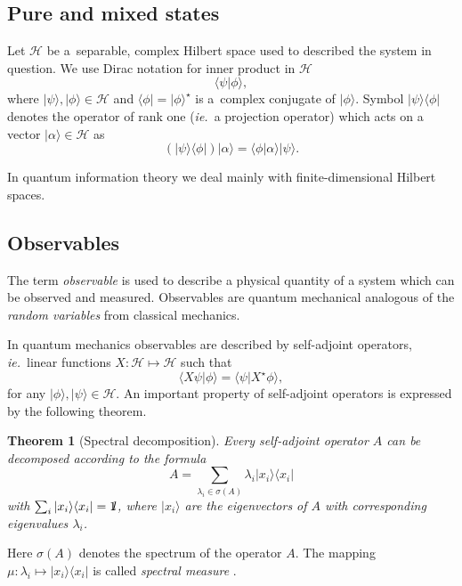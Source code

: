 \documentclass{elsart}
\newcommand{\ket}[1]{\ensuremath{|#1\rangle}}
\newcommand{\bra}[1]{\ensuremath{\langle#1|}}
\newcommand{\1}{{\rm 1\hspace{-0.9mm}l}}
\newcommand{\Id}{\1}
\newcommand{\HS}[1]{\ensuremath{\mathcal{#1}}} %
\newcommand{\ie}{\emph{ie.}}
\newcommand{\Observ}[1]{\ensuremath{#1}}
\newcommand{\Spectrum}[1]{\ensuremath{\sigma(#1)}}
\newcommand{\Spec}[1]{\Spectrum{#1}}
\newcommand{\ketbra}[2]{\ensuremath{\ket{#1}\bra{#2}}}
\newcommand{\proj}[1]{\ensuremath{\ketbra{#1}{#1}}}
\newcommand{\Proj}[1]{\proj{#1}}
\newcommand{\iner}[2]{\braket{#1}{#2}}
\newcommand{\Iner}[2]{\iner{#1}{#2}}
\newcommand{\braket}[2]{\ensuremath{\langle#1|#2\rangle}}
\newtheorem{theorem}{Theorem}
\begin{document}
\subsection{Pure and mixed states}
Let $\HS{H}$ be a~separable, complex Hilbert space used
to described the system in question. We use Dirac notation
\cite{dirac58principles} for inner product in $\HS{H}$
\begin{equation}
  \Iner{\psi}{\phi},
\label{eqn:dirac-iner}
\end{equation}
where $\ket{\psi},\ket{\phi}\in\HS{H}$ and $\bra{\phi} = \ket{\phi}^\star$ 
is a~complex conjugate of $\ket{\phi}$. Symbol $\ket{\psi}\bra{\phi}$ denotes
the operator of rank one (\ie\ a projection operator) which acts on a vector
$\ket{\alpha}\in\HS{H}$ as
\begin{equation}
\left(\ket{\psi}\bra{\phi}\right)\ket{\alpha} = \Iner{\phi}{\alpha}\ket{\psi}.
\label{eqn:dirac-proj}
\end{equation}

In quantum information theory we deal mainly with finite-dimensional Hilbert
spaces.

\subsection{Observables}
The term \emph{observable} is used to describe a physical
quantity of a system which can be observed and measured. Observables are
quantum mechanical analogous of the \emph{random variables} from classical mechanics.

In quantum mechanics observables are described by self-adjoint operators,
\ie\ linear functions $X:\HS{H}\mapsto\HS{H}$ such that
\begin{equation}
\Iner{X\psi}{\phi}=\Iner{\psi}{X^\star\phi},
\label{eqn:selfadj}
\end{equation}
for any $\ket{\phi},\ket{\psi}\in\HS{H}$. An important property of self-adjoint
operators is expressed by the following theorem.

\begin{theorem}[Spectral decomposition]
Every self-adjoint operator $\Observ{A}$ can be decomposed according to the
formula
\begin{equation}
\Observ{A} = \sum_{\lambda_i\in\Spec{\Observ{A}}} \lambda_i\proj{x_i}
\end{equation}
with $\sum_i\Proj{x_i}=\Id$, where $\ket{x_i}$ are the eigenvectors of
$\Observ{A}$ with corresponding eigenvalues $\lambda_i$.
\end{theorem}
Here $\sigma(A)$ denotes the spectrum of the operator $A$. The mapping
$\mu:\lambda_i\mapsto \Proj{x_i}$ is called \emph{spectral
measure} \cite{mlak}.
\end{document}

